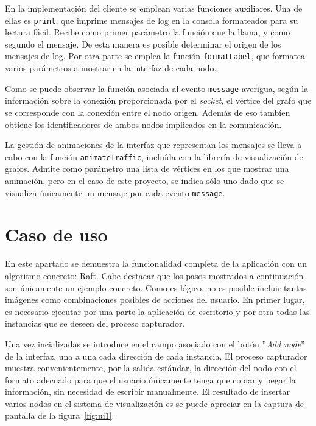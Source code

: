 En la implementación del cliente se emplean varias funciones auxiliares. Una de ellas es \texttt{print}, que imprime mensajes de log en la consola formateados para su lectura fácil. Recibe como primer parámetro la función que la llama, y como segundo el mensaje. De esta manera es posible determinar el origen de los mensajes de log. Por otra parte se emplea la función \texttt{formatLabel}, que formatea varios parámetros a mostrar en la interfaz de cada nodo.

Como se puede observar la función asociada al evento \texttt{message} averigua, según la información sobre la conexión proporcionada por el \textit{socket}, el vértice del grafo que se corresponde con la conexión entre el nodo origen. Además de eso tambíen obtiene los identificadores de ambos nodos implicados en la comunicación.

La gestión de animaciones de la interfaz que representan los mensajes se lleva a cabo con la función \texttt{animateTraffic}, incluída con la librería de visualización de grafos. Admite como parámetro una lista de vértices en los que mostrar una animación, pero en el caso de este proyecto, se indica sólo uno dado que se visualiza únicamente un mensaje por cada evento \texttt{message}.

\section{Caso de uso}

En este apartado se demuestra la funcionalidad completa de la aplicación con un algoritmo concreto: Raft. Cabe destacar que los pasos mostrados a continuación son únicamente un ejemplo concreto. Como es lógico, no es posible incluir tantas imágenes como combinaciones posibles de acciones del usuario. En primer lugar, es necesario ejecutar por una parte la aplicación de escritorio y por otra todas las instancias que se deseen del proceso capturador.

Una vez incializadas se introduce en el campo asociado con el botón ''\textit{Add node}'' de la interfaz, una a una cada dirección de cada instancia. El proceso capturador muestra convenientemente, por la salida estándar, la dirección del nodo con el formato adecuado para que el usuario únicamente tenga que copiar y pegar la información, sin necesidad de escribir manualmente. El resultado de insertar varios nodos en el sistema de visualización es se puede apreciar en la captura de pantalla de la figura~\ref{fig:ui1}.


